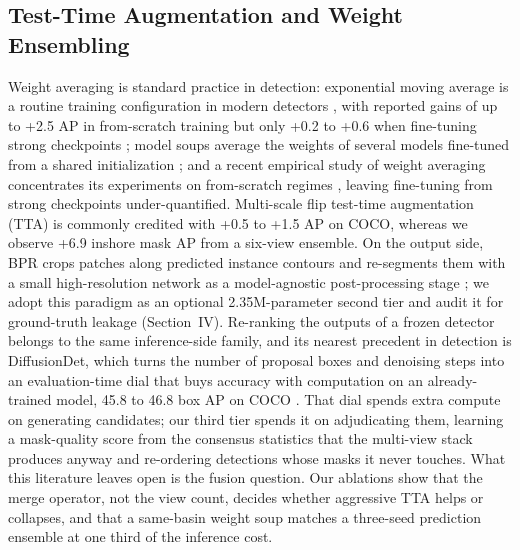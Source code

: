 \subsection{Test-Time Augmentation and Weight Ensembling}
\label{sec:related-tta}
Weight averaging is standard practice in detection: exponential moving average is a routine training configuration in modern detectors \cite{rtdetrv22024}, with reported gains of up to +2.5 AP in from-scratch training but only +0.2 to +0.6 when fine-tuning strong checkpoints \cite{switchema2024}; model soups average the weights of several models fine-tuned from a shared initialization \cite{modelsoups2022}; and a recent empirical study of weight averaging concentrates its experiments on from-scratch regimes \cite{weightavg2025}, leaving fine-tuning from strong checkpoints under-quantified. Multi-scale flip test-time augmentation (TTA) is commonly credited with +0.5 to +1.5 AP on COCO, whereas we observe +6.9 inshore mask AP from a six-view ensemble. On the output side, BPR crops patches along predicted instance contours and re-segments them with a small high-resolution network as a model-agnostic post-processing stage \cite{bpr2021}; we adopt this paradigm as an optional 2.35M-parameter second tier and audit it for ground-truth leakage (Section~IV). Re-ranking the outputs of a frozen detector belongs to the same inference-side family, and its nearest precedent in detection is DiffusionDet, which turns the number of proposal boxes and denoising steps into an evaluation-time dial that buys accuracy with computation on an already-trained model, 45.8 to 46.8 box AP on COCO \cite{diffusiondet2023}. That dial spends extra compute on generating candidates; our third tier spends it on adjudicating them, learning a mask-quality score from the consensus statistics that the multi-view stack produces anyway and re-ordering detections whose masks it never touches. What this literature leaves open is the fusion question. Our ablations show that the merge operator, not the view count, decides whether aggressive TTA helps or collapses, and that a same-basin weight soup matches a three-seed prediction ensemble at one third of the inference cost.


